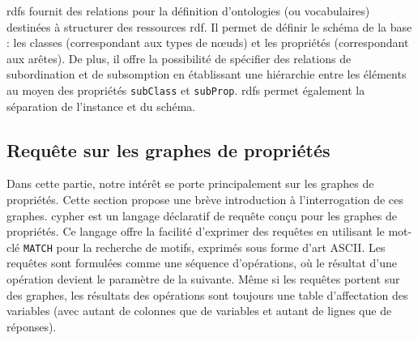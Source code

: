 \gls{rdfs} fournit des relations pour la définition d'ontologies (ou vocabulaires) destinées à structurer des ressources \gls{rdf}.
Il permet de définir le schéma de la base : les classes (correspondant aux types de nœuds) et les propriétés (correspondant aux arêtes).
De plus, il offre la possibilité de spécifier des relations de subordination et de subsomption en établissant une hiérarchie entre les éléments au moyen des propriétés \verb|subClass| et \verb|subProp|.
\gls{rdfs} permet également la séparation de l'instance et du schéma.

\subsection{Requête sur les graphes de propriétés}
Dans cette partie, notre intérêt se porte principalement sur les graphes de propriétés.
Cette section propose une brève introduction à l'interrogation de ces graphes.
\gls{cypher} est un langage déclaratif de requête conçu pour les graphes de propriétés.
Ce langage offre la facilité d'exprimer des requêtes en utilisant le mot-clé \verb|MATCH| pour la recherche de motifs, exprimés sous forme d'art ASCII.
Les requêtes sont formulées comme une séquence d'opérations, où le résultat d'une opération devient le paramètre de la suivante.
Même si les requêtes portent sur des graphes, les résultats des opérations sont toujours une table d'affectation des variables (avec autant de colonnes que de variables et autant de lignes que de réponses).

